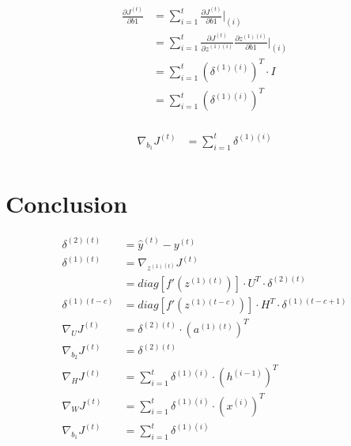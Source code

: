 \documentclass{article}
\begin{document}
	\begin{equation}
	\begin{aligned}
		\frac{\partial J^{(t)}}{\partial b1} &= \sum_{i=1}^{t} \frac{\partial J^{(t)}}{\partial b1}\bigg|_{(i)}  \\
		&= \sum_{i=1}^{t}
		\frac{\partial J^{(t)}}{\partial z^{(1)(i)}} 
		\frac{\partial z^{(1)(i)}}{\partial b1}\bigg|_{(i)} \\
		&= \sum_{i=1}^{t}
		(\delta^{(1)(i)})^T \cdot I \\
		&= \sum_{i=1}^{t} (\delta^{(1)(i)})^T\\
	\end{aligned}
	\end{equation}
	
	\begin{equation}
	\begin{aligned}
		\nabla_{b_1} J^{(t)} &= \sum_{i=1}^{t} \delta^{(1)(i)} \\
	\end{aligned}
	\end{equation}	
	
	\section{Conclusion}
	\begin{align}
		\delta^{(2)(t)} &= \hat{y}^{(t)} - y^{(t)} \\
		\delta^{(1)(t)} &= \nabla_{z^{(1)(t)}} J^{(t)} \\
		&= diag[f'(z^{(1)(t)})] \cdot U^T \cdot \delta^{(2)(t)}\\
		\delta^{(1)(t-c)} &= diag[f'(z^{(1)(t-c)})] \cdot H^T \cdot \delta^{(1)(t-c+1)}\\
		\nabla_U J^{(t)} &= \delta^{(2)(t)} \cdot (a^{(1)(t)})^T\\
		\nabla_{b_2} J^{(t)} &= \delta^{(2)(t)} \\
		\nabla_H J^{(t)} &= \sum_{i=1}^{t} \delta^{(1)(i)} \cdot  (h^{(i-1)})^T\\
		\nabla_W J^{(t)} &= \sum_{i=1}^{t} \delta^{(1)(i)} \cdot  (x^{(i)})^T\\
		\nabla_{b_1} J^{(t)} &= \sum_{i=1}^{t} \delta^{(1)(i)} \\
	\end{align}
\end{document}
